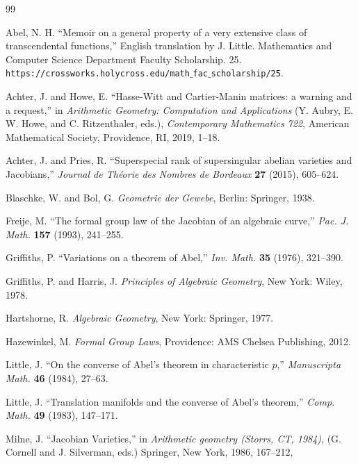 \documentclass[12pt]{amsart}
\theoremstyle{theorem}
\begin{document}

\begin{thebibliography}{99}

 Abel, N. H.  
``Memoir on a general property of a very extensive class of transcendental functions,'' English translation
by J. Little.  Mathematics and Computer Science Department Faculty Scholarship. 25.
{\tt https://crossworks.holycross.edu/math$\_$fac$\_$scholarship/25}.

 Achter, J.  and Howe, E.  ``Hasse-Witt and Cartier-Manin matrices:  a warning and a request,'' in
{\it Arithmetic Geometry: Computation and Applications} (Y. Aubry, E. W. Howe, and C. Ritzenthaler, eds.), 
{\it Contemporary Mathematics 722}, American Mathematical Society, Providence, RI, 2019, 1--18.  

  Achter, J. and Pries, R. ``Superspecial rank of supersingular abelian varieties and Jacobians,''  {\it Journal de Th\'eorie des Nombres de Bordeaux} 
{\bf 27} (2015), 605--624.

 Blaschke, W. and Bol, G. {\it Geometrie der Gewebe},  Berlin: Springer, 1938.

  Freije, M.  ``The formal group law of the Jacobian of an algebraic curve,''
{\it Pac. J. Math.}  {\bf 157} (1993), 241--255. 

  Griffiths, P.  ``Variations on a theorem of Abel,'' {\it Inv. Math.} {\bf 35} (1976), 321--390.

  Griffiths, P. and Harris, J.  {\it Principles of Algebraic Geometry}, New York: Wiley, 1978.

 Hartshorne, R.  {\it Algebraic Geometry}, New York: Springer, 1977.

 Hazewinkel, M.  {\it Formal Group Laws}, Providence: AMS Chelsea Publishing, 2012.

 Little, J.  ``On the converse of Abel's theorem in characteristic $p$,'' {\it Manuscripta Math.} {\bf 46} (1984), 27--63.

 Little, J. ``Translation manifolds and the converse of Abel's theorem,'' {\it Comp. Math.} {\bf 49} (1983), 147--171.

 Milne, J.  ``Jacobian Varieties,''  in {\it Arithmetic geometry (Storrs, CT,
1984)}, (G. Cornell and J. Silverman, eds.) Springer, New York, 1986, 167--212, 



\end{thebibliography}
\end{document}
